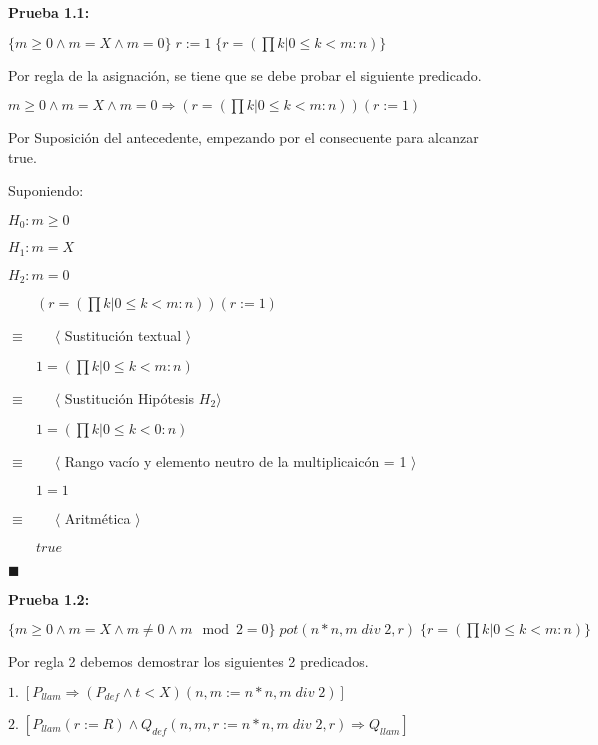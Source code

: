 \documentclass[hidelinks]{article}
\begin{document}
\textbf{Prueba 1.1:}\par
$\{m \geq 0 \land m = X \land m = 0\} \; r := 1 \; \{r = (\prod k | 0 \leq k < m: n)\}$\par

Por regla de la asignación, se tiene que se debe probar el siguiente predicado.\par

$m \geq 0 \land m = X \land m = 0 \Rightarrow (r = (\prod k | 0 \leq k < m: n))(r := 1)$\par

Por Suposición del antecedente, empezando por el consecuente para alcanzar
true.\par

Suponiendo:\par
$H_0: m \geq 0$\par
$H_1: m = X$\par
$H_2: m = 0$\par

$\qquad (r = (\prod k | 0 \leq k < m: n))(r := 1)$\par
$\equiv \qquad \langle$ Sustitución textual $\rangle$\par
$\qquad 1 = (\prod k | 0 \leq k < m: n)$\par
$\equiv \qquad \langle$ Sustitución Hipótesis $H_2\rangle$\par
$\qquad 1 = (\prod k | 0 \leq k < 0: n)$\par
$\equiv \qquad \langle$ Rango vacío y elemento neutro de la multiplicaicón = 1 $\rangle$\par
$\qquad 1 = 1$\par
$\equiv \qquad \langle$ Aritmética $\rangle$\par
$\qquad true$\par
$\blacksquare$\par

\textbf{Prueba 1.2:}\par
$\{m \geq 0 \land m = X \land m \neq 0 \land m \mod 2 = 0\} \; pot(n*n, m \; div \; 2, r) \; \{r = (\prod k | 0 \leq k < m: n)\}$\par

Por regla 2 debemos demostrar los siguientes 2 predicados.\par
$1.\;[P_{llam} \Rightarrow (P_{def} \land t < X)(n, m := n*n, m \; div \; 2)]$\par
$2.\;[P_{llam}(r := R) \land Q_{def}(n, m, r := n*n,m \; div \; 2, r) \Rightarrow Q_{llam}]$\par
\end{document}

